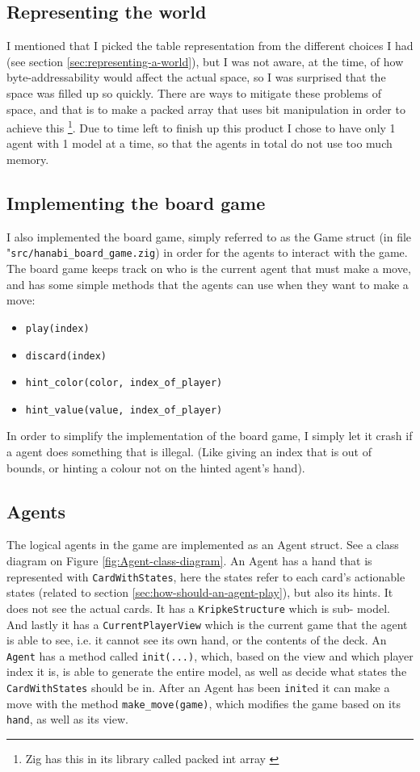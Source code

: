\subsection{Representing the world}
I mentioned that I picked the table representation from the different choices I had (see section \ref{sec:representing-a-world}), but I was not aware, at the time, of how byte-addressability would affect the actual space, so I was surprised that the space was filled up so quickly.
There are ways to mitigate these problems of space, and that is to make a packed array that uses bit manipulation in order to achieve this \footnote{Zig has this in its library called packed int array \cite{zigpackedintarr}}.
Due to time left to finish up this product I chose to have only 1 agent with 1 model at a time, so that the agents in total do not use too much memory.

\subsection{Implementing the board game}
I also implemented the board game, simply referred to as the Game struct (in file "{\tt src/hanabi\_board\_game.zig}) in order for the agents to interact with the game.
The board game keeps track on who is the current agent that must make a move, and has some simple methods that the agents can use when they want to make a move:

\begin{itemize}
	\item {\tt play(index)}
	\item {\tt discard(index)}
	\item {\tt hint\_color(color, index\_of\_player) }
	\item {\tt hint\_value(value, index\_of\_player) }
\end{itemize}
In order to simplify the implementation of the board game, I simply let it crash if a agent does something that is illegal.
(Like giving an index that is out of bounds, or hinting a colour not on the hinted agent's hand).


\subsection{Agents}
The logical agents in the game are implemented as an Agent struct.
See a class diagram on Figure \ref{fig:Agent-class-diagram}.
An Agent has a hand that is represented with {\tt CardWithStates}, here the states refer to each card's actionable states (related to section \ref{sec:how-should-an-agent-play}), but also its hints.
It does not see the actual cards.
It has a {\tt KripkeStructure} which is sub-\SfiveN{} model.
And lastly it has a {\tt CurrentPlayerView} which is the current game that the agent is able to see, i.e. it cannot see its own hand, or the contents of the deck.
An {\tt Agent} has a method called {\tt init(...)}, which, based on the view and which player index it is, is able to generate the entire model, as well as decide what states the {\tt CardWithStates} should be in.
After an Agent has been {\tt init}ed it can make a move with the method {\tt make\_move(game)}, which modifies the game based on its {\tt hand}, as well as its view.

